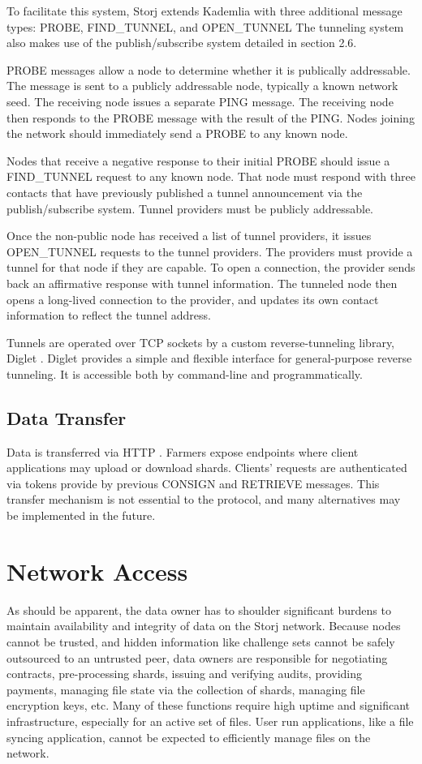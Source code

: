 \documentclass[a4paper,10pt]{article}
\begin{document}
To facilitate this system, Storj extends Kademlia with three additional message
types: PROBE, FIND\_TUNNEL, and OPEN\_TUNNEL The tunneling system also makes use
of the publish/subscribe system detailed in section 2.6.

PROBE messages allow a node to determine whether it is publically addressable.
The message is sent to a publicly addressable node, typically a known network
seed. The receiving node issues a separate PING message. The receiving node then
responds to the PROBE message with the result of the PING. Nodes joining the
network should immediately send a PROBE to any known node.

Nodes that receive a negative response to their initial PROBE should issue a
FIND\_TUNNEL request to any known node. That node must respond with three
contacts that have previously published a tunnel announcement via the
publish/subscribe system. Tunnel providers must be publicly addressable.

Once the non-public node has received a list of tunnel providers, it issues
OPEN\_TUNNEL requests to the tunnel providers. The providers must provide a
tunnel for that node if they are capable. To open a connection, the provider
sends back an affirmative response with tunnel information. The tunneled node
then opens a long-lived connection to the provider, and updates its own contact
information to reflect the tunnel address.

Tunnels are operated over TCP sockets by a custom reverse-tunneling library,
Diglet \cite{14}. Diglet provides a simple and flexible interface for
general-purpose reverse tunneling. It is accessible both by command-line and
programmatically.

\subsection{Data Transfer}
Data is transferred via HTTP \cite{15}. Farmers expose endpoints where client
applications may upload or download shards. Clients' requests are authenticated
via tokens provide by previous CONSIGN and RETRIEVE messages. This transfer
mechanism is not essential to the protocol, and many alternatives may be
implemented in the future.


\section{Network Access}
As should be apparent, the data owner has to shoulder significant burdens to
maintain availability and integrity of data on the Storj network. Because nodes
cannot be trusted, and hidden information like challenge sets cannot be safely
outsourced to an untrusted peer, data owners are responsible for negotiating
contracts, pre-processing shards, issuing and verifying audits, providing
payments, managing file state via the collection of shards, managing file
encryption keys, etc. Many of these functions require high uptime and
significant infrastructure, especially for an active set of files. User run
applications, like a file syncing application, cannot be expected to efficiently
manage files on the network.
\end{document}
